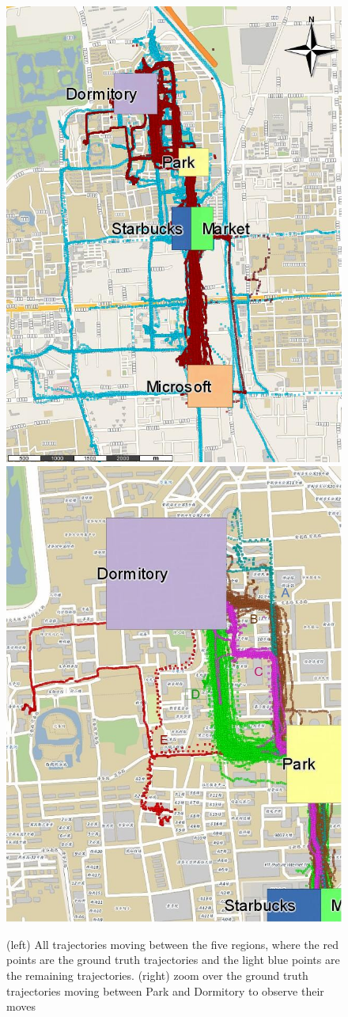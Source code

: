 \documentclass[12pt]{article}
\begin{document}
\begin{figure}[ht!]
\centering
\centerline{
\includegraphics[width=.5\textwidth]{Images/new_Geolife-Trajectories-painted.jpg}
\includegraphics[width=.5\textwidth]{Images/Geolife-Paths-painted.jpg}
}
\caption{(left) All trajectories moving between the five regions, where the red points are the ground truth trajectories and the light blue points are the remaining trajectories. (right) zoom over the ground truth trajectories moving between Park and Dormitory to observe their moves}
\label{fig:geolife_map_rois}
\end{figure}
\end{document}
